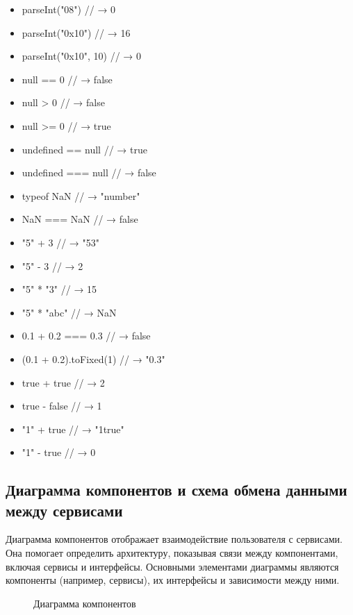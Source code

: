 \begin{itemize}
  \item parseInt("08") // → 0
  \item parseInt("0x10") // → 16
  \item parseInt("0x10", 10) // → 0
  \item null == 0 // → false
  \item null > 0 // → false
  \item null >= 0 // → true
  \item undefined == null // → true
  \item undefined === null // → false
  \item typeof NaN // → "number"
  \item NaN === NaN // → false
  \item "5" + 3 // → "53"
  \item "5" - 3 // → 2
  \item "5" * "3" // → 15
  \item "5" * "abc" // → NaN
  \item 0.1 + 0.2 === 0.3 // → false
  \item (0.1 + 0.2).toFixed(1) // → "0.3"
  \item true + true // → 2
  \item true - false // → 1
  \item "1" + true // → "1true"
  \item "1" - true // → 0
\end{itemize}



\subsection{Диаграмма компонентов и схема обмена данными между сервисами}

Диаграмма компонентов отображает взаимодействие пользователя с сервисами. Она помогает определить архитектуру, показывая связи между компонентами, включая сервисы и интерфейсы. Основными элементами диаграммы являются компоненты (например, сервисы), их интерфейсы и зависимости между ними.

\begin{figure}[ht]
\caption{Диаграмма компонентов}
\label{comp:image}
\end{figure}

